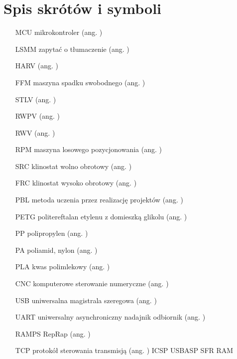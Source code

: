 \chapter*{Spis skrótów i symboli}

\begin{itemize}
	\item[MCU] mikrokontroler (ang. )
	\item[LSMM] zapytać o tłumaczenie  (ang. )
	\item[HARV]   ({ang. })
	\item[FFM] maszyna spadku swobodnego ({ang. })
	\item[STLV]  ({ang. })
	\item[RWPV]  ({ang. })
	\item[RWV]  ({ang. })
	\item[RPM] maszyna losowego pozycjonowania ({ang. })
	\item[SRC] klinostat wolno obrotowy ({ang. })
	\item[FRC] klinostat wysoko obrotowy  ({ang. })
	\item[PBL] metoda uczenia przez realizację projektów   ({ang. })
	\item[PETG] politereftalan etylenu z domieszką glikolu  ({ang. })
	\item[PP] polipropylen ({ang. })
	\item[PA] poliamid, nylon ({ang. })
	\item[PLA] kwas polimlekowy ({ang. })
	\item[CNC] komputerowe sterowanie numeryczne ({ang. })
	\item[USB] uniwersalna magistrala szeregowa ({ang. })
	\item[UART] uniwersalny asynchroniczny nadajnik odbiornik ({ang. })
	\item[RAMPS] RepRap   ({ang. })
	\item[TCP] protokół sterowania transmisją ({ang. })
	ICSP
	USBASP
	SFR
	RAM
\end{itemize}
